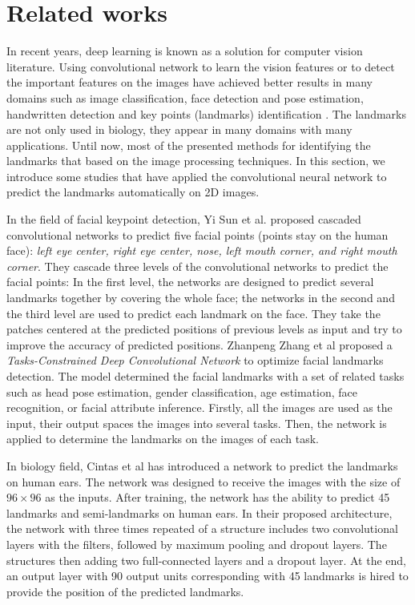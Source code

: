 \documentclass[conference]{IEEEtran}
\begin{document}
\section{Related works}
In recent years, deep learning is known as a solution for computer vision literature. Using convolutional network to learn the vision features or to detect the important features on the images have achieved better results in many domains such as image classification\cite{krizhevsky2012imagenet}\cite{ciregan2012multi}, face detection and pose estimation\cite{li2015convolutional,lawrence1997face,farfade2015multi,osadchy2007synergistic}, handwritten detection\cite{lecun1990handwritten}\cite{graves2009offline} and key points (landmarks) identification \cite{sun2013deep,zhang2014facial,cintas2016automatic}. The landmarks are not only used in biology, they appear in many domains with many applications. Until now, most of the presented methods for identifying the landmarks that based on the image processing techniques\cite{palaniswamy2010automatic}\cite{kaur2015automatic}\cite{le2017maelab}. In this section, we introduce some studies that have applied the convolutional neural network to predict the landmarks automatically on 2D images.

In the field of facial keypoint detection, Yi Sun et al.\cite{sun2013deep} proposed cascaded convolutional networks to predict five facial points (points stay on the human face): \textit{left eye center, right eye center, nose, left mouth corner, and right mouth corner}. They cascade three levels of the convolutional networks to predict the facial points: In the first level, the networks are designed to predict several landmarks together by covering the whole face; the networks in the second and the third level are used to predict each landmark on the face. They take the patches centered at the predicted positions of previous levels as input and try to improve the accuracy of predicted positions. Zhanpeng Zhang et al\cite{zhang2014facial} proposed a \textit{Tasks-Constrained Deep Convolutional Network} to optimize facial landmarks detection. The model determined the facial landmarks with a set of related tasks such as head pose estimation, gender classification, age estimation, face recognition, or facial attribute inference. Firstly, all the images are used as the input, their output spaces the images into several tasks. Then, the network is applied to determine the landmarks on the images of each task. 

In biology field, Cintas et al\cite{cintas2016automatic} has introduced a network to predict the landmarks on human ears. The network was designed to receive the images with the size of $96 \times 96$ as the inputs. After training, the network has the ability to predict 45 landmarks and semi-landmarks on human ears. In their proposed architecture, the network with three times repeated of a structure includes two convolutional layers with the filters, followed by maximum pooling and dropout layers. The structures then adding two full-connected layers and a dropout layer. At the end, an output layer with 90 output units corresponding with 45 landmarks is hired to provide the position of the predicted landmarks.
\end{document}
